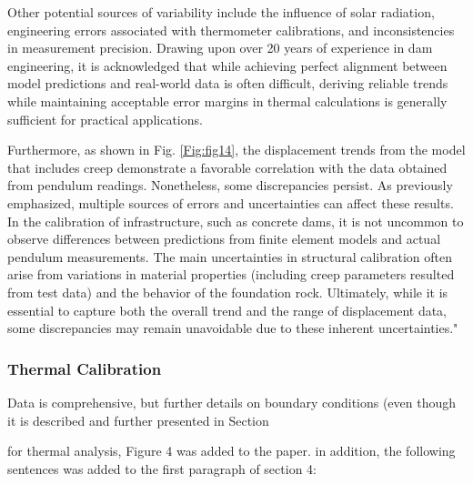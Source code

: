 \documentclass{ar2rc}
\begin{document}
	Other potential sources of variability include the influence of solar radiation, engineering errors associated with thermometer calibrations, and inconsistencies in measurement precision. Drawing upon over 20 years of experience in dam engineering, it is acknowledged that while achieving perfect alignment between model predictions and real-world data is often difficult, deriving reliable trends while maintaining acceptable error margins in thermal calculations is generally sufficient for practical applications.
	
	Furthermore, as shown in Fig. \ref{Fig:fig14}, the displacement trends from the model that includes creep demonstrate a favorable correlation with the data obtained from pendulum readings. Nonetheless, some discrepancies persist. As previously emphasized, multiple sources of errors and uncertainties can affect these results. In the calibration of infrastructure, such as concrete dams, it is not uncommon to observe differences between predictions from finite element models and actual pendulum measurements. The main uncertainties in structural calibration often arise from variations in material properties (including creep parameters resulted from test data) and the behavior of the foundation rock. Ultimately, while it is essential to capture both the overall trend and the range of displacement data, some discrepancies may remain unavoidable due to these inherent uncertainties."
	
	\subsubsection{Thermal Calibration}
	
	\RC Data is comprehensive, but further details on boundary conditions (even though it is described and further presented in Section 
	
	\AR for thermal analysis, Figure 4 was added to the paper. in addition, the following sentences was added to the first paragraph of section 4:
	
\end{document}
